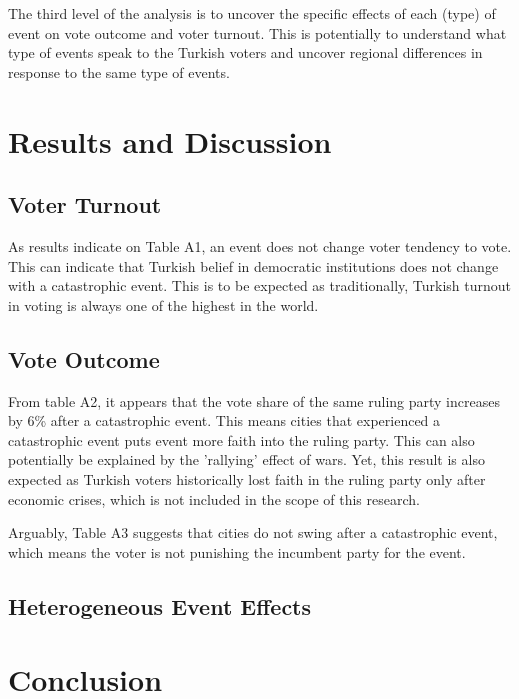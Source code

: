 \documentclass[12pt]{article}
\begin{document}
The third level of the analysis is to uncover the specific effects of each (type) of event on vote outcome and voter turnout. This is potentially to understand what type of events speak to the Turkish voters and uncover regional differences in response to the same type of events.

\section{Results and Discussion}

\subsection{Voter Turnout}

As results indicate on Table A1, an event does not change voter tendency to vote. This can indicate that Turkish belief in democratic institutions does not change with a catastrophic event. This is to be expected as traditionally, Turkish turnout in voting is always one of the highest in the world.

\subsection{Vote Outcome}

From table A2, it appears that the vote share of the same ruling party increases by 6\% after a catastrophic event. This means cities that experienced a catastrophic event puts event more faith into the ruling party. This can also potentially be explained by the 'rallying' effect of wars. Yet, this result is also expected as Turkish voters historically lost faith in the ruling party only after economic crises, which is not included in the scope of this research. 

Arguably, Table A3 suggests that cities do not swing after a catastrophic event, which means the voter is not punishing the incumbent party for the event. 


\subsection{Heterogeneous Event Effects}

\section{Conclusion}
\end{document}
